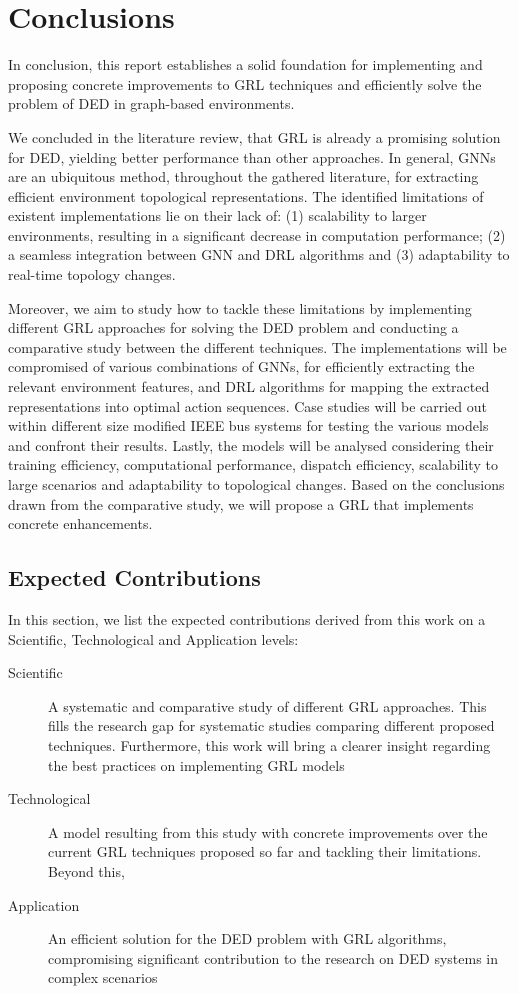 \chapter{Conclusions} \label{chap:conclusions}

In conclusion, this report establishes a solid foundation for implementing and proposing concrete improvements to \ac{GRL} techniques and efficiently solve the problem of \ac{DED} in graph-based environments. \par
We concluded in the literature review, that \ac{GRL} is already a promising solution for \ac{DED}, yielding better performance than other approaches. In general, \acp{GNN} are an ubiquitous method, throughout the gathered literature, for extracting efficient environment topological representations. The identified limitations of existent implementations lie on their lack of: (1) scalability to larger environments, resulting in a significant decrease in computation performance; (2) a seamless integration between \ac{GNN} and \ac{DRL} algorithms and (3) adaptability to real-time topology changes. \par
Moreover, we aim to study how to tackle these limitations by implementing different \ac{GRL} approaches for solving the \ac{DED} problem and conducting a comparative study between the different techniques. The implementations will be compromised of various combinations of \acp{GNN}, for efficiently extracting the relevant environment features, and \ac{DRL} algorithms for mapping the extracted representations into optimal action sequences. Case studies will be carried out within different size modified IEEE bus systems for testing the various models and confront their results. Lastly, the models will be analysed considering their training efficiency, computational performance, dispatch efficiency, scalability to large scenarios and adaptability to topological changes. Based on the conclusions drawn from the comparative study, we will propose a \ac{GRL} that implements concrete enhancements.

\section{Expected Contributions}

In this section, we list the expected contributions derived from this work on a Scientific, Technological and Application levels:
\begin{description}
	\item[Scientific] A systematic and comparative study of different \ac{GRL} approaches. This fills the research gap for systematic studies comparing different proposed techniques. Furthermore, this work will bring a clearer insight regarding the best practices on implementing \ac{GRL} models
	\item[Technological] A model resulting from this study with concrete improvements over the current \ac{GRL} techniques proposed so far and tackling their limitations. Beyond this, 
	\item[Application] An efficient solution for the \ac{DED} problem with \ac{GRL} algorithms, compromising significant contribution to the research on \ac{DED} systems in complex scenarios
\end{description}

